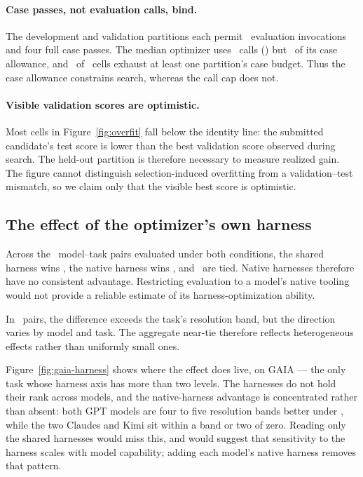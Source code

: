 \paragraph{Case passes, not evaluation calls, bind.}
The development and validation partitions each permit \EvalCallCap\ evaluation
invocations and four full case passes. The median optimizer uses \EvalCallsUsed\ calls
(\EvalCallFrac) but \CasePassFrac\ of its case allowance, and
\NBudgetExhausted\ of \NBudgetCells\ cells exhaust at least one partition's case
budget. Thus the case allowance constrains search, whereas the call cap does not.

\paragraph{Visible validation scores are optimistic.}
Most cells in Figure~\ref{fig:overfit} fall below the identity line: the
submitted candidate's test score is lower than the best validation score observed
during search. The held-out partition is therefore necessary to measure realized
gain. The figure cannot distinguish selection-induced overfitting from a
validation--test mismatch, so we claim only that the visible best score is
optimistic.

\subsection{The effect of the optimizer's own harness}
\label{sec:rq3}

Across the \NHarnessPairs\ model--task pairs evaluated under both conditions,
the shared harness wins \CommonWins, the native harness wins \NativeWins, and
\HarnessTies\ are tied. Native harnesses therefore have no consistent advantage.
Restricting evaluation to a model's native tooling would not provide a reliable
estimate of its harness-optimization ability.

In \NHarnessPairsResolved\ pairs, the difference exceeds the task's resolution
band, but the direction varies by model and task. The aggregate near-tie
therefore reflects heterogeneous effects rather than uniformly small ones.

Figure~\ref{fig:gaia-harness} shows where the effect does live, on GAIA --- the
only task whose harness axis has more than two levels. The harnesses do not hold
their rank across models, and the native-harness advantage is concentrated rather
than absent: both GPT models are four to five resolution bands better under
\codex, while the two Claudes and Kimi sit within a band or two of zero. Reading
only the shared harnesses would miss this, and would suggest that sensitivity to
the harness scales with model capability; adding each model's native harness
removes that pattern.
